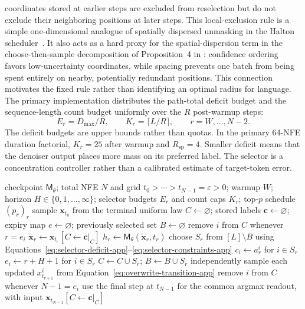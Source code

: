 \documentclass{article}
\newcommand{\1}{\mathbf 1}
\theoremstyle{definition}
\begin{document}
coordinates stored at earlier steps are excluded from reselection but do not
exclude their neighboring positions at later steps. This local-exclusion rule
is a simple one-dimensional analogue of spatially dispersed unmasking in the
Halton scheduler~\citep{besnier2025halton}. It also acts as a hard proxy for
the spatial-dispersion term in the choose-then-sample decomposition of
Proposition~4 in \citet{hayakawa2026demystifying}: confidence ordering favors
low-uncertainty coordinates, while spacing prevents one batch from being spent
entirely on nearby, potentially redundant positions. This connection motivates
the fixed rule rather than identifying an optimal radius for language.
The primary implementation distributes the path-total deficit budget and the
sequence-length count budget uniformly over the $R$ post-warmup steps:
\[
 E_r=D_{\max}/R,
 \qquad
 K_r=\lceil L/R\rceil,
 \qquad r=W,\ldots,N-2.
\]
The deficit budgets are upper bounds rather than quotas. In the primary
64-NFE duration factorial, $K_r=25$ after warmup and
$R_{\mathrm{sp}}=4$.
Smaller deficit means that the denoiser output places more mass on its preferred
label. The selector is a concentration controller rather than a calibrated
estimate of target-token error.

\begin{algorithm}[H]
\caption{Committed reveal with horizon $H$}
\label{alg:crs-horizon}
\small
\begin{algorithmic}[1]
\Require checkpoint $\mathsf M_\theta$; total NFE $N$ and grid
$t_0>\cdots>t_{N-1}=\varepsilon>0$;
warmup $W$; horizon $H\in\{0,1,\ldots,\infty\}$; selector budgets $E_r$ and
count caps $K_r$;
top-$p$ schedule $(p_r)_r$
\State sample $\bm x_{t_0}$ from the terminal uniform law
\State $C\gets\varnothing$; stored labels $\bm c\gets\varnothing$;
expiry map $e\gets\varnothing$; previously selected set $B\gets\varnothing$
    \State remove $i$ from $C$ whenever $r=e_i$
  \EndIf
  \State $\widetilde{\bm x}_r\gets\bm x_{t_r}[C\leftarrow\bm c|_C]$
  \State $h_r\gets\mathsf M_\theta(\widetilde{\bm x}_r,t_r)$
    \State choose $S_r$ from $[L]\setminus B$ using
    Equations~\eqref{eq:selector-deficit-app}--\eqref{eq:selector-constraints-app}
    \State $c_i\gets a_r^i$ for $i\in S_r$
      \State $e_i\gets r+H+1$ for $i\in S_r$
    \EndIf
    \State $C\gets C\cup S_r$; $B\gets B\cup S_r$
  \EndIf
  \State independently sample each updated $x_{t_{r+1}}^i$ from
  Equation~\eqref{eq:overwrite-transition-app}
\EndFor
{}
  \State remove $i$ from $C$ whenever $N-1=e_i$
\EndIf
\State use the final step at $t_{N-1}$ for the common argmax readout,
with input $\bm x_{t_{N-1}}[C\leftarrow\bm c|_C]$
\end{algorithmic}
\end{algorithm}
\end{document}
